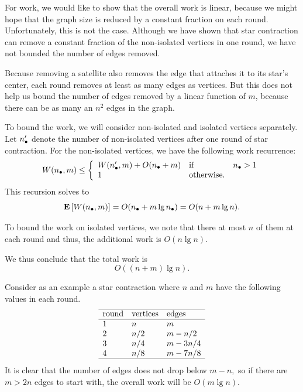 \begin{flex}
\begin{gram}
\label{graphcon::star::contraction::cost::proof::work}
For work, we would like to show that the overall work is linear,
because we might hope that the graph size is reduced by a constant
fraction on each round.
%
Unfortunately, this is not the case.  Although we have shown that star
contraction can remove a constant fraction of the non-isolated
vertices in one round, we have not bounded the number of edges
removed.
%

%
Because removing a satellite also removes the edge that attaches it to
its star's center, each round  removes at least as many edges as vertices.  
%
But this does not help us bound
the number of edges removed by a linear function of $m$, because there
can be as many an $n^2$ edges in the graph.
%

To bound the work, we will consider non-isolated and isolated vertices
separately.
%
Let $n_\bullet'$  denote the  number of non-isolated vertices after one
round of star contraction.
%
For the non-isolated vertices, we have the following work recurrence:
\[
\begin{array}{lll}
W(n_\bullet, m) 
\leq 
\left\{
\begin{array}{lll}
W(n_\bullet', m) + O(n_\bullet+m) & \mbox{if} & n_\bullet > 1
\\
1 & \mbox{otherwise.}
\end{array}
\right.
\end{array}
\]
%
This recursion solves to
\[
\mathbf{E}\left[{W(n_\bullet,m)}\right] = O(n_\bullet + m\lg n_\bullet) = O(n + m \lg{n}).
\]

To bound the work on isolated vertices, we note that there at most $n$
of them at each round and thus, the additional work is $O(n \lg{n}).$

We thus conclude that the total work is
\[
O((n + m)\lg{n}).
\]
\end{gram}

\begin{note}
Consider as an example a star contraction where $n$ and $m$ have the
following values in each round.
\[
\begin{array}{lll}
\hline
 \mbox{round} & \mbox{vertices} & \mbox{edges}
\\
\hline
 1 & n & m 
\\
 2 & n/2 & m - n/2 
\\
 3 & n/4 & m - 3n/4 
\\
 4 & n/8 & m - 7n/8 
\\
\hline
 \end{array}
\]
It is clear that the number of edges does not drop below $m-n,$ so if
there are $m > 2n$ edges to start with, the overall work will be $O(m
\lg n)$.
%
\end{note}
%
\end{flex}

